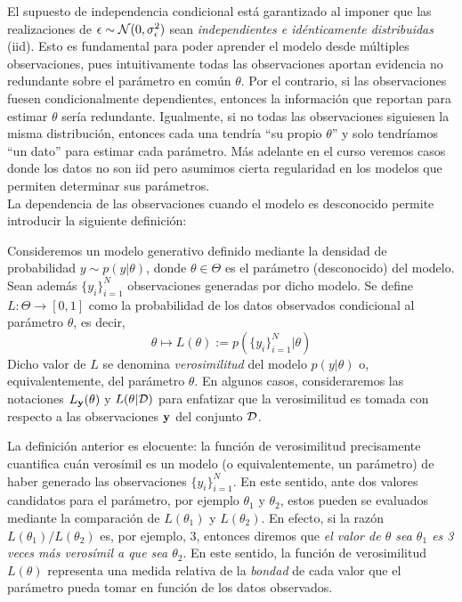 El supuesto de independencia condicional está garantizado al imponer que las realizaciones de $\epsilon\sim{\mathcal N}(0,\sigma_\epsilon^2)$ sean \emph{independientes e idénticamente distribuidas} (iid). Esto es  fundamental para poder aprender el modelo desde múltiples observaciones, pues intuitivamente todas las observaciones aportan evidencia no redundante sobre el parámetro en común $\theta$. Por el contrario, si las observaciones fuesen condicionalmente dependientes, entonces la información que reportan para estimar $\theta$ sería redundante. Igualmente, si no todas las observaciones siguiesen la misma distribución, entonces cada una tendría ``su propio $\theta$'' y solo tendríamos ``un  dato'' para estimar cada parámetro. Más adelante en el curso veremos casos donde los datos no son iid pero asumimos cierta regularidad en los modelos que permiten determinar sus parámetros.\\

La dependencia de las observaciones cuando el modelo es desconocido permite introducir la siguiente definición:

\begin{definition}[verosimilitud]
Consideremos un  modelo generativo definido mediante la densidad de  probabilidad  $y\sim p(y|\theta)$, donde $\theta\in\Theta$ es el parámetro (desconocido) del modelo. Sean además $\{y_i\}_{i=1}^N$ observaciones generadas por dicho modelo. Se define $L: \Theta \to [0,1]$ como la probabilidad de los datos observados condicional al parámetro $\theta$, es decir, 
\begin{equation}
			\theta   \mapsto L(\theta) :=  p(\{y_i\}_{i=1}^N | \theta)
\end{equation}
Dicho valor de $L$ se denomina \emph{verosimilitud} del modelo $p(y|\theta)$ o, equivalentemente, del  parámetro $\theta$. En algunos casos, consideraremos las notaciones $L_{\mathbf{y}}(\theta)$ y $L(\theta|{\mathcal D})$ para enfatizar que la verosimilitud es tomada con respecto a las observaciones  $\mathbf{y}$ del conjunto ${\mathcal D}$.
\end{definition}

La definición anterior es elocuente: la función de verosimilitud precisamente cuantifica cuán verosímil es un modelo (o equivalentemente, un parámetro) de haber generado las observaciones $\{y_i\}_{i=1}^N$. En este sentido, ante dos valores candidatos para el parámetro, por ejemplo $\theta_1$ y $\theta_2$, estos pueden se evaluados mediante la comparación de $L(\theta_1)$ y $L(\theta_2)$. En efecto, si la razón $L(\theta_1)/L(\theta_2)$ es, por ejemplo, 3, entonces diremos que \emph{el valor de $\theta$ sea $\theta_1$ es 3 veces más verosímil a que sea $\theta_2$}. En este sentido, la función de verosimilitud  $L(\theta)$ representa una medida relativa de la \emph{bondad} de cada valor que el parámetro pueda tomar en función de los datos observados.\\

